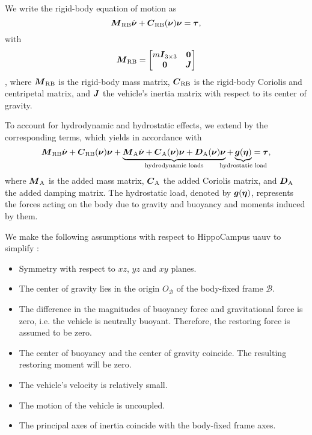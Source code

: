 We write the rigid-body equation of motion as
\begin{equation}
	\label{eq:rigid-body-equation-of-motion}
	\mbox{$\bm{M}$}_\text{RB} \mbox{$\dot{\bm{\nu}}$}
	+ \mbox{$\bm{C}$}_\text{RB}(\mbox{$\bm{\nu}$}) \mbox{$\bm{\nu}$}
	= \mbox{$\bm{\tau}$}
	,
\end{equation}
with
\begin{equation}
	\label{eq:rigid-body-mass-matrix}
	\mbox{$\bm{M}$}_\text{RB} =
	\begin{bmatrix}
		m \mbox{$\bm{I}$}_{3 \times 3} & \bm{0} \\
		\bm{0} & \mbox{$\bm{J}$}
	\end{bmatrix}
\end{equation},
where $\mbox{$\bm{M}$}_\text{RB}$ is the rigid-body mass matrix, $\mbox{$\bm{C}$}_\text{RB}$ is the rigid-body Coriolis and centripetal matrix, and $\mbox{$\bm{J}$}$ the vehicle's inertia matrix with respect to its center of gravity.

To account for hydrodynamic and hydrostatic effects, we extend  by the corresponding terms, which yields in accordance with \cite{Fossen11}
\begin{equation}
	\label{eq:6dof-equation-of-motion}
	\Mrigid \nubp + \Crigid(\nub) \nub +
	\underbrace{
		\Madded \nubp +
		\Cadded(\nub) \nub +
		\Dadded(\nub) \nub
	}_\text{hydrodynamic loads}
	+ 
	\underbrace{
		\gb(\etab)
	}_\text{\makebox[0pt]{hydrostatic load}}
	= \taub
	,
\end{equation}
where $\mbox{$\bm{M}$}_\text{A}$ is the added mass matrix, $\mbox{$\bm{C}$}_\text{A}$ the added Coriolis matrix, and $\mbox{$\bm{D}$}_\text{A}$ the added damping matrix.
The hydrostatic load, denoted by $\mbox{$\bm{g}$}(\mbox{$\bm{\eta}$})$, represents the forces acting on the body due to gravity and buoyancy and moments induced by them.

We make the following assumptions with respect to HippoCampus \ac{uauv} to simplify :
\begin{itemize}
	\item Symmetry with respect to $xz$, $yz$ and $xy$ planes.
	\item The center of gravity lies in the origin $O_\mathcal{B}$ of the body-fixed frame $\mathcal{B}$.
	\item The difference in the magnitudes of buoyancy force and gravitational force is zero, i.e. the vehicle is neutrally buoyant. Therefore, the restoring force is assumed to be zero.
	\item The center of buoyancy and the center of gravity coincide. The resulting restoring moment will be zero.
	\item The vehicle's velocity is relatively small.
	\item The motion of the vehicle is uncoupled.
	\item The principal axes of inertia coincide with the body-fixed frame axes.
\end{itemize}

